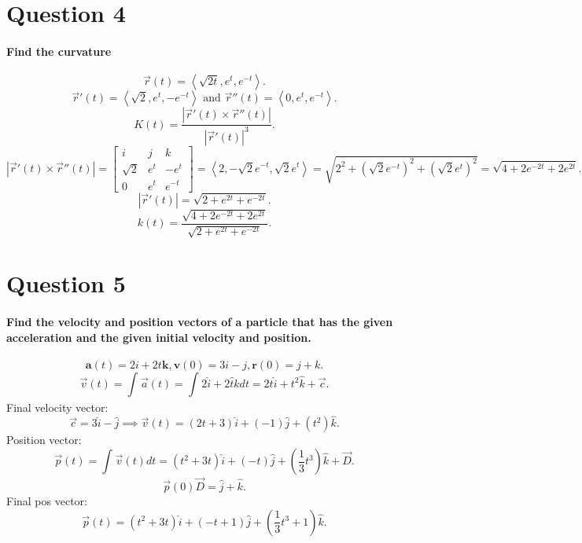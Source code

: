 \section{Question 4}%
\label{sec: Question 4 }
\paragraph{Find the curvature}
\[
\vec{ r }\left( t \right) = \left\langle \sqrt{ 2t } , e^{ t }, e^{ -t } \right\rangle
.\] 
\[
\vec{ r }'\left( t \right) = \left< \sqrt{ 2 } , e^{ t }, -e^{ -t } \right> \text{ and } \vec{ r }''\left( t \right) = \left< 0, e^{ t }, e^{ -t } \right>
.\] 
\[
K\left( t \right) = \frac{ \left| \vec{ r }'\left( t \right) \times \vec{ r }''\left( t \right)  \right| }{ \left| \vec{ r }'\left( t \right)  \right|^3 }
.\] 
\[
	\left| \vec{ r }'\left( t \right) \times \vec{ r }''\left( t \right)  \right| = \begin{bmatrix} i & j & k \\ \sqrt{ 2 } & e^{ t } & -e^{ t } \\ 0 & e^{ t } & e^{ -t } \end{bmatrix} = \left< 2,-\sqrt{ 2 } e^{ -t }, \sqrt{ 2 } e^{ t } \right> = \sqrt{ 2^2+\left( \sqrt{ 2 } e^{ -t } \right) ^2 + \left( \sqrt{ 2 } e^{ t } \right) ^2 } = \sqrt{ 4 + 2e^{ -2t }+2e^{ 2t } } 
.\] 
\[
\left| \vec{ r }'\left( t \right)  \right| = \sqrt{ 2+e^{ 2t }+e^{ -2t } } 
.\] 
\[
k\left( t \right) = \frac{ \sqrt{ 4 + 2e^{ -2t }+2e^{ 2t } } }{ \sqrt{ 2+e^{ 2t }+e^{ -2t } } }
.\] 

\section{Question 5}%
\label{sec: Question 5 }
\paragraph{Find the velocity and position vectors of a particle that has the given acceleration and the given initial velocity and position.}
\[
	\mathbf{a}\left( t \right) = 2i + 2t \mathbf{ k } ,  \mathbf{ v } \left( 0 \right) = 3i-j,  \mathbf{ r } \left( 0 \right) = j + k
.\] 
\[
\vec{ v }\left( t \right) = \int_{  }^{  } \vec{ a }\left( t \right)  = \int_{  }^{  } 2\hat{ i }+2\hat{t}k dt =2t \hat{ i } + t^2 \hat{ k } + \vec{ c }
.\] 
Final velocity vector:
\[
	\vec{ c }= 3 \hat{ i } - \hat{ j } \implies \vec{ v }\left( t \right) = \left( 2t+3 \right) \hat{ i } + \left( -1 \right) \hat{ j } + \left( t^2 \right) \hat{ k }
.\] 
Position vector:
\[
\vec{ p }\left( t \right) = \int_{  }^{  } \vec{ v }\left( t \right) dt = \left( t^2 + 3t \right) \hat{ i } + \left( -t \right) \hat{ j } + \left( \frac{ 1 }{ 3 } t^3 \right) \hat{ k } + \vec{ D }	
.\] 
\[
\vec{ p }\left( 0 \right) \vec{ D } = \hat{ j } + \hat{ k }
.\] 
Final pos vector:
\[
\vec{ p }\left( t \right) = \left( t^2 + 3t \right) \hat{ i } + \left( -t + 1  \right) \hat{ j } + \left( \frac{ 1 }{ 3 } t^3 + 1 \right) \hat{ k }
.\] 

